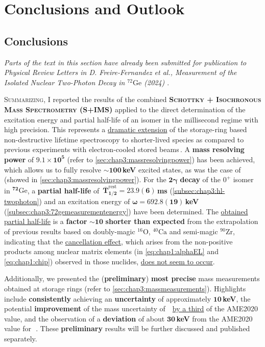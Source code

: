 
\chapter{Conclusions and Outlook}
\section{Conclusions}\label{sec:concl:conclusions}
\textit{\footnotesize Parts of the text in this section have already been submitted for publication to Physical Review Letters in D. Freire-Fernandez et al., Measurement of the Isolated Nuclear Two-Photon Decay in $^{72}\mathrm{Ge}$ (2024) \cite{freirefernández2023measurement}}.

\lettrine{S}{ummarizing}, I reported the results of the combined \textbf{\textsc{Schottky + Isochronous Mass Spectrometry (S+IMS)}} applied to the direct determination of the excitation energy and partial half-life of an isomer in the millisecond regime with high precision. This represents a \underline{dramatic extension} of the storage-ring based non-destructive lifetime spectroscopy to shorter-lived species as compared to previous experiments with electron-cooled stored beams\,\cite{Litvinov-2011}. A \textbf{mass resolving power} of $\bm{9.1\times10^5}$ (refer to \cref{sec:chap3:massresolvingpower}) has been achieved, which allows us to fully resolve $\bm{\sim100}$\,\textbf{keV} excited states, as was the case of \, (showed in \cref{sec:chap3:massresolvingpower}). For the $\bm{2\gamma}$ \textbf{decay} of the $0^+$ isomer in $\bm{^{72}\mathrm{Ge}}$, a \textbf{partial half-life} of \,$\bm{\overline{T}_{1/2}^{\mathrm{rest}} = 23.9\left(6\right)}$\,\textbf{ms} (\cref{subsec:chap3:hl-twophoton}) and an excitation energy of $\bm{\omega=692.8\left(19\right)}$\,\textbf{keV} (\cref{subsec:chap3:72gemeasurementenergy}) have been determined.
The \underline{obtained partial half-life} is a \textbf{factor} $\bm{\sim10}$ \textbf{shorter than expected} from the extrapolation of previous results based on 
doubly-magic $^{16}\mathrm{O}$, $^{40}\mathrm{Ca}$ and semi-magic $^{90}\mathrm{Zr}$, indicating that the \underline{cancellation effect}, which arises from the non-positive products among nuclear matrix elements (in \cref{eq:chap1:alphaEL} and \cref{eq:chap1:chip}) observed in those nuclides, \underline{does not seem to occur}.

Additionally, we presented the (\textbf{preliminary}) \textbf{most precise} mass measurements obtained at storage rings (refer to \cref{sec:chap3:massmeasurements}). Highlights include \textbf{consistently} achieving an \textbf{uncertainty} of approximately $\bm{10}$\,\textbf{keV}, the potential \textbf{improvement} of the mass uncertainty of \,\, \underline{by a third} of the \textsc{AME2020} value, and the observation of a \textbf{deviation} of about $\bm{30}$\,\textbf{keV} from the \textsc{AME2020} value for \,\,. These \textbf{preliminary} results will be further discussed and published separately.

